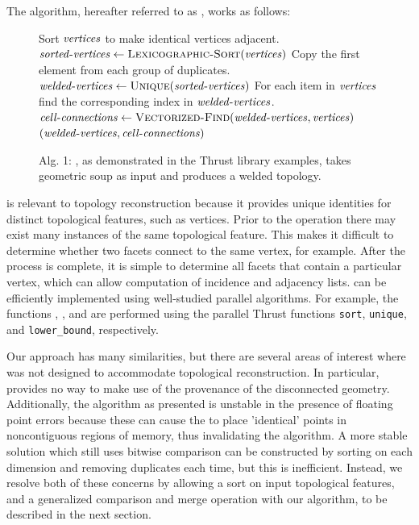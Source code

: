 \documentclass[10pt,journal,cspaper,compsoc]{IEEEtran}
\begin{document}
The algorithm, hereafter referred to as , works as follows:
\begin{figure}
\vspace{-0.3cm}
\begin{codebox}
  \zi \Comment Sort $\id{vertices}$ to make identical vertices adjacent.
  \li $\id{sorted-vertices} \gets \proc{Lexicographic-Sort}(\id{vertices})$
  \zi \Comment Copy the first element from each group of duplicates.
  \li $\id{welded-vertices} \gets \proc{Unique}(\id{sorted-vertices})$
  \zi \Comment For each item in $\id{vertices}$ find the corresponding index
  \zi \Comment in $\id{welded-vertices}$.
  \li $\id{cell-connections} \gets \proc{Vectorized-Find}(\id{welded-vertices},\id{vertices})$
  \li \Return $( \id{welded-vertices}, \id{cell-connections} )$
\end{codebox}
\vspace{-0.5cm}
\caption*{Alg. 1: , as demonstrated in the Thrust library examples, takes geometric soup as input and produces a welded topology.}
\end{figure}

 is relevant to topology reconstruction because it provides unique identities for distinct topological features, such as vertices. Prior to the operation there may exist many instances of the same topological feature. This makes it difficult to determine whether two facets connect to the same vertex, for example. After the  process is complete, it is simple to determine all facets that contain a particular vertex, which can allow computation of incidence and adjacency lists.   can be efficiently implemented using well-studied parallel algorithms.  For example, the functions ,
, and  are performed using the parallel
Thrust functions \texttt{sort}, \texttt{unique}, and \texttt{lower\_bound},
respectively.

Our approach has many similarities, but there are several areas of interest where  was not designed to accommodate topological reconstruction. In particular,  provides no way to make use of the provenance of the disconnected geometry. Additionally, the  algorithm as presented is unstable in the presence of floating point errors because these can cause the  to place 'identical' points in noncontiguous regions of memory, thus invalidating the algorithm. A more stable solution which still uses bitwise comparison can be constructed by sorting on each dimension and removing duplicates each time, but this is inefficient. Instead, we resolve both of these concerns by allowing a sort on input topological features, and a generalized comparison and merge operation with our algorithm, to be described in the next section.
\end{document}
